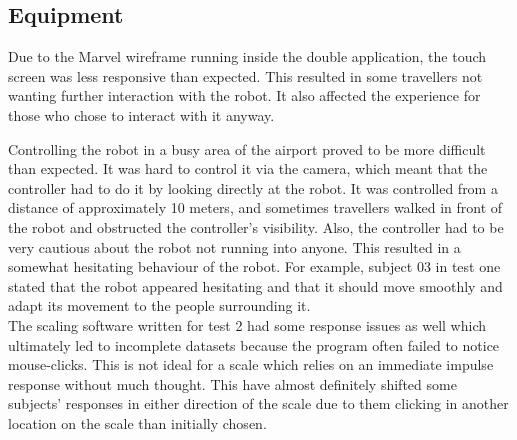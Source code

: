 \subsection{Equipment}
Due to the Marvel wireframe running inside the double application, the touch screen was less responsive than expected. This resulted in some travellers not wanting further interaction with the robot. It also affected the experience for those who chose to interact with it anyway.

Controlling the robot in a busy area of the airport proved to be more difficult than expected. It was hard to control it via the camera, which meant that the controller had to do it by looking directly at the robot. It was controlled from a distance of approximately 10 meters, and sometimes travellers walked in front of the robot and obstructed the controller's visibility. Also, the controller had to be very cautious about the robot not running into anyone. This resulted in a somewhat hesitating behaviour of the robot. For example, subject 03 in test one stated that the robot appeared hesitating and that it should move smoothly and adapt its movement to the people surrounding it.\\
The scaling software written for test 2 had some response issues as well which ultimately led to incomplete datasets because the program often failed to notice mouse-clicks. This is not ideal for a scale which relies on an immediate impulse response without much thought. This have almost definitely shifted some subjects' responses in either direction of the scale due to them clicking in another location on the scale than initially chosen.